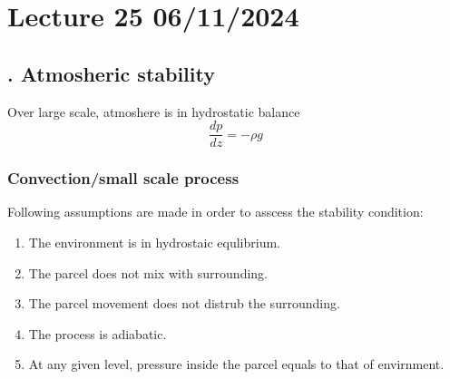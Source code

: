 \documentclass[fleqn,10pt]{SelfArx} %
\begin{document}
\section{Lecture 25 06/11/2024}

\subsection{. Atmosheric stability}
Over large scale, atmoshere is in hydrostatic balance
\begin{equation}
    \frac{dp}{dz} = -\rho g
    \label{eq:hyfrostatic_eq}
\end{equation}

\subsubsection*{Convection/small scale process}
Following assumptions are made in order to asscess the stability condition:
\begin{enumerate}[noitemsep]
    \item The environment is in hydrostaic equlibrium.
    \item The parcel does not mix with surrounding.
    \item The parcel movement does not distrub the surrounding.
    \item The process is adiabatic.
    \item At any given level, pressure inside the parcel equals to that of envirnment. \label{assumption5}
\end{enumerate}
\end{document}
